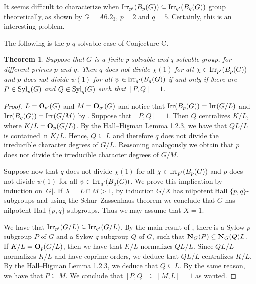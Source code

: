 \documentclass[12pt,leqno,a4paper]{amsart}
\def\syl#1#2{{\rm Syl}_#1(#2)}
\def\oh#1#2{{\bf O}_{#1}(#2)}
\def\norm#1#2{{\bf N}_{#1}(#2)}
\def\irrp#1#2{{\rm Irr}_{#1'}(#2)}
\def\sbs{\subseteq}
\newtheorem{thm}{Theorem}[section]
\theoremstyle{remark}
\begin{document}
\medskip

It seems difficult to
characterize when 
  $\irrp{p}{B_p(G)} \sbs \irrp{q}{B_q(G)}$ group theoretically, as shown by
   $G=A6.2_3$, $p=2$ and $q=5$. Certainly, this is an interesting problem.
   
   \medskip
   The following is the $p$-$q$-solvable case of Conjecture C.
   \medskip
   
   \begin{thm}
   Suppose that $G$ is a finite $p$-solvable and $q$-solvable group,
   for different primes $p$ and $q$. Then $q$ does not divide $\chi(1)$ for all
   $\chi \in {\rm Irr}_{p'}(B_p(G))$ and $p$ does not divide $\psi(1)$
   for all  
   $\psi \in {\rm Irr}_{q'}(B_q(G))$ if and only if there are $P \in \syl pG$ and $Q \in \syl qG$
   such that $[P,Q]=1$.
    \end{thm}
    
    \begin{proof} $L=\oh{p'}G$ and $M=\oh{q'}G$ and notice that ${\rm Irr}(B_p(G))={\rm Irr}(G/L)$ and ${\rm Irr}(B_q(G))={\rm Irr}(G/M)$ by \cite[Theorem 10.20]{nbook}.
    Suppose that $[P,Q]=1$. Then $Q$ centralizes $K/L$, where  $K/L=\oh p{G/L}$. By the Hall--Higman Lemma 1.2.3, we have that $QL/L$ is contained in $K/L$.
    Hence, $Q \sbs L$ and therefore $q$ does not divide the irreducible character degrees
    of $G/L$. Reasoning analogously we obtain that $p$ does not divide the irreducible character degrees
    of $G/M$.
    
    Suppose now that $q$ does not divide $\chi(1)$ for all
   $\chi \in {\rm Irr}_{p'}(B_p(G))$ and $p$ does not divide $\psi(1)$
   for all  
   $\psi \in {\rm Irr}_{q'}(B_q(G))$. We prove this implication by induction on $|G|$. If $X=L\cap M>1$, by induction $G/X$ has nilpotent Hall $\{p,q\}$-subgroups and using the Schur--Zassenhaus theorem we conclude that $G$ has nilpotent Hall $\{p,q\}$-subgroups. Thus we may assume that $X=1$.
   
   We have that ${\rm Irr}_{p'}(G/L) \sbs {\rm Irr}_{q'}(G/L)$. By the main result of
   \cite{NWo}, there is a Sylow $p$-subgroup $P$ of $G$ and a Sylow $q$-subgroup
   $Q$ of $G$, such that $\norm GP \sbs \norm GQ L$. 
   If $K/L=\oh p{G/L}$, then we have that $K/L$ normalizes $QL/L$.
   Since $QL/L$ normalizes $K/L$ and have coprime orders, we deduce that $QL/L$
   centralizes $K/L$. By the Hall--Higman Lemma 1.2.3, we deduce that $Q\sbs L$.
   By the same reason, we have that $P \sbs M$. We conclude that $[P,Q]\subseteq[M,L]=1$ as wanted. 
      \end{proof}
   
\end{document}
